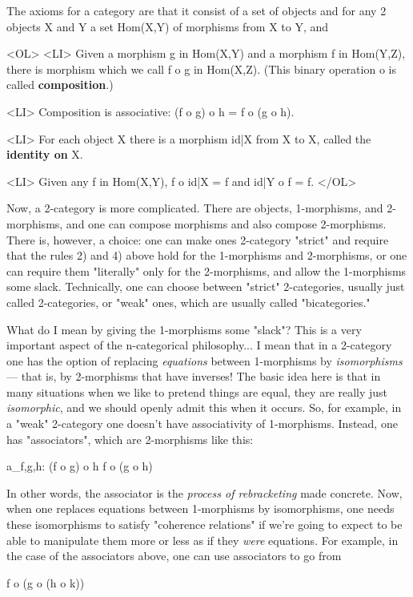 The axioms for a category are that it consist of a set of objects and
for any 2 objects X and Y a set Hom(X,Y) of morphisms from X to Y, and

<OL>
<LI> Given a morphism g in Hom(X,Y) and a morphism f in Hom(Y,Z), there
is morphism which we call f o g in Hom(X,Z).  (This binary operation  o  is
called \textbf{composition}.)

<LI> Composition is associative:   (f o g) o h = f o (g o h).

<LI>  For each object X there is a morphism id|X from X to X, called the
\textbf{identity on} X.

<LI>  Given any f in Hom(X,Y), f o id|X = f and id|Y o f = f.
</OL>

Now, a 2-category is more complicated.  There are objects, 1-morphisms,
and 2-morphisms, and one can compose morphisms and also compose 
2-morphisms.  There is, however, a choice: one can make ones 2-category
"strict" and require that the rules 2) and 4) above hold for the
1-morphisms and 2-morphisms, or one can require them "literally" only
for the 2-morphisms, and allow the 1-morphisms some slack.  Technically,
one can choose between "strict" 2-categories, usually just called
2-categories, or "weak" ones, which are usually called "bicategories."  

What do I mean by giving the 1-morphisms some "slack"?  This is a very
important aspect of the n-categorical philosophy... I mean that in a
2-category one has the option of replacing \emph{equations} between
1-morphisms by \emph{isomorphisms} --- that is, by 2-morphisms that have
inverses!  The basic idea here is that in many situations when we like
to pretend things are equal, they are really just \emph{isomorphic}, and we
should openly admit this when it occurs.  So, for example, in a "weak"
2-category one doesn't have associativity of 1-morphisms.  Instead, one
has "associators", which are 2-morphisms like this:

a_{f,g,h}: (f o g) o h \to  f o (g o h) 

In other words, the associator is the \emph{process of rebracketing} made
concrete.  Now, when one replaces equations between 1-morphisms by
isomorphisms, one needs these isomorphisms to satisfy "coherence
relations" if we're going to expect to be able to manipulate them more
or less as if they \emph{were} equations.  For example, in the case of the
associators above, one can use associators to go from

f o (g o (h o k)) 

